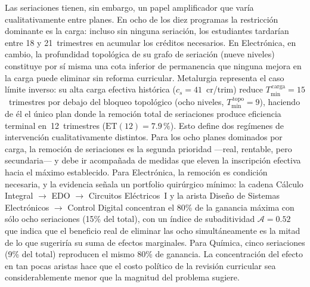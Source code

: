\documentclass[11pt,letterpaper]{article}
\begin{document}
Las seriaciones tienen, sin embargo, un papel amplificador que varía cualitativamente entre
planes.
En ocho de los diez programas la restricción dominante es la carga: incluso sin ninguna
seriación, los estudiantes tardarían entre 18 y 21~trimestres en acumular los créditos
necesarios.
En Electrónica, en cambio, la profundidad topológica de su grafo de seriación
(nueve niveles) constituye por sí misma una cota inferior de permanencia que ninguna
mejora en la carga puede eliminar sin reforma curricular.
Metalurgia representa el caso límite inverso: su alta carga efectiva histórica
($c_s=41$~cr/trim) reduce $T_{\min}^{\,\mathrm{carga}}=15$~trimestres por debajo del
bloqueo topológico (ocho niveles, $T_{\min}^{\,\mathrm{topo}}=9$), haciendo de él
el único plan donde la remoción total de seriaciones produce eficiencia terminal
en~12~trimestres ($\mathrm{ET}(12)=7.9\,\text{\%}$).
Esto define dos regímenes de intervención cualitativamente distintos.
Para los ocho planes dominados por carga, la remoción de seriaciones es la segunda
prioridad ---real, rentable, pero secundaria--- y debe ir acompañada de medidas que eleven
la inscripción efectiva hacia el máximo establecido.
Para Electrónica, la remoción es condición necesaria, y la evidencia señala un portfolio
quirúrgico mínimo: la cadena Cálculo Integral $\to$ EDO $\to$ Circuitos Eléctricos~I
y la arista Diseño de Sistemas Electrónicos $\to$ Control Digital concentran el 80\% de
la ganancia máxima con sólo ocho seriaciones (15\% del total), con un índice de
subaditividad $\mathcal{A}=0.52$ que indica que el beneficio real de eliminar las ocho
simultáneamente es la mitad de lo que sugeriría su suma de efectos marginales.
Para Química, cinco seriaciones (9\% del total) reproducen el mismo 80\% de ganancia.
La concentración del efecto en tan pocas aristas hace que el costo político de la
revisión curricular sea considerablemente menor que la magnitud del problema sugiere.
\end{document}
